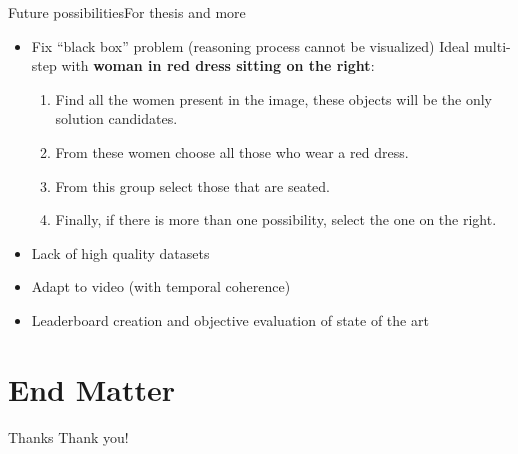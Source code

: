 \documentclass{beamer}
\begin{document}
\begin{frame}{Future possibilities}{For thesis and more}
  \begin{itemize}
    \item Fix ``black box'' problem (reasoning process cannot be visualized)
    Ideal multi-step with \textbf{woman in red dress sitting on the right}:
    \begin{enumerate}
      \item Find all the women present in the image, these objects will be the only
      solution candidates.
      \item From these women choose all those who wear a red dress.
      \item From this group select those that are seated.
      \item Finally, if there is more than one possibility, select the one on the
      right.
    \end{enumerate}
    \item Lack of high quality datasets
    \item Adapt to video (with temporal coherence)
    \item Leaderboard creation and objective evaluation of state of the art
  \end{itemize}
\end{frame}



\section*{End Matter}


\begin{frame}{Thanks}
  \centering
  Thank you!
\end{frame}
\end{document}
